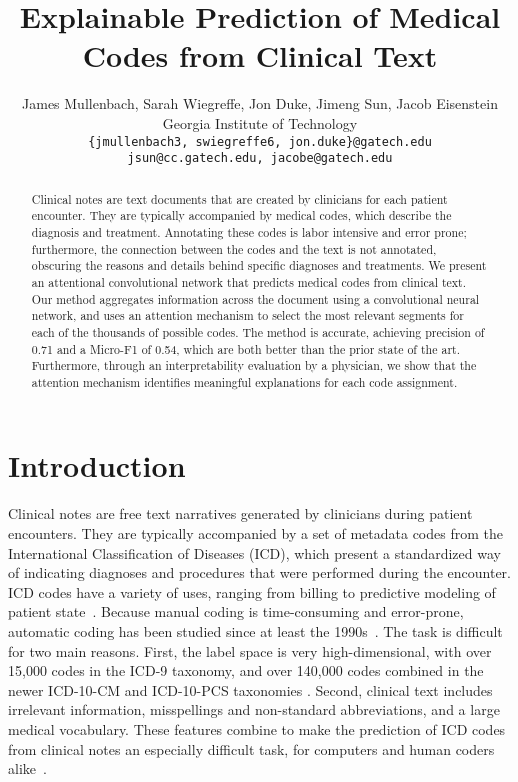 \documentclass[11pt,a4paper]{article}
\title{Explainable Prediction of Medical Codes from Clinical Text}
\author{James Mullenbach, Sarah Wiegreffe, Jon Duke, Jimeng Sun, Jacob Eisenstein \\
     Georgia Institute of Technology \\
     \texttt{\{jmullenbach3, swiegreffe6, jon.duke\}@gatech.edu} \\ \texttt{jsun@cc.gatech.edu, jacobe@gatech.edu} \\
   }
\date{}
\newcommand{\pate}{precision}
\begin{document}
\maketitle

\begin{abstract}
Clinical notes are text documents that are created by clinicians for each patient encounter. They are typically accompanied by medical codes, which describe the diagnosis and treatment. Annotating these codes is labor intensive and error prone; furthermore, the connection between the codes and the text is not annotated, obscuring the reasons and details behind specific diagnoses and treatments. We present an attentional convolutional network that predicts medical codes from clinical text. Our method aggregates information across the document using a convolutional neural network, and uses an attention mechanism to select the most relevant segments for each of the thousands of possible codes. The method is accurate, achieving \pate{} of 0.71 and a Micro-F1 of 0.54, which are both better than the prior state of the art. Furthermore, through an interpretability evaluation by a physician, we show that the attention mechanism identifies meaningful explanations for each code assignment.
\end{abstract}

\section{Introduction}
Clinical notes are free text narratives generated by clinicians during patient encounters.
They are typically accompanied by a set of metadata codes from the International Classification of Diseases (ICD), which present a standardized way of indicating diagnoses and procedures that were performed during the encounter. ICD codes have a variety of uses, ranging from billing to predictive modeling of patient state~\cite{choi2016doctor, ranganath2015survival,denny2010phewas,avati2017improving}. Because manual coding is time-consuming and error-prone, automatic coding has been studied since at least the 1990s~\cite{de1998hierarchical}. The task is difficult for two main reasons. First, the label space is very high-dimensional, with over 15,000 codes in the ICD-9 taxonomy, and over 140,000 codes combined in the newer ICD-10-CM and ICD-10-PCS taxonomies \cite{ICD10}. Second, clinical text includes irrelevant information, misspellings and non-standard abbreviations, and a large medical vocabulary. These features combine to make the prediction of ICD codes from clinical notes an especially difficult task, for computers and human coders alike~\cite{birman2005accuracy}.
\end{document}
